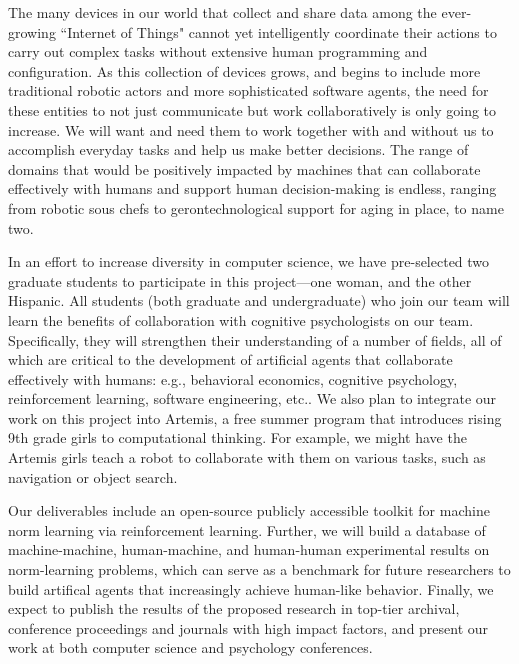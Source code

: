 The many devices in our world that collect and share data among
the ever-growing ``Internet of Things"
cannot yet intelligently coordinate their actions to carry out complex
tasks without extensive human programming and configuration.  As this
collection of devices grows, and begins to include more traditional
robotic actors and more sophisticated software agents, the need for
these entities to not just communicate but work collaboratively is
only going to increase.  We will want and need them to work together
with and without us to accomplish everyday tasks and help us make
better decisions.
%
The range of domains that would be positively impacted by machines
that can collaborate effectively with humans and support human
decision-making is endless, ranging from robotic sous chefs to
gerontechnological support for aging in place, to name two.


In an effort to increase diversity in computer science, we have
pre-selected two graduate students to participate in this
project---one woman, and the other Hispanic.  All students (both
graduate and undergraduate) who join our team will learn the benefits
of collaboration with cognitive psychologists on our team.  Specifically, they will
strengthen their understanding of a number of fields, all of which are
critical to the development of artificial agents that collaborate
effectively with humans: e.g., behavioral economics, cognitive
psychology, reinforcement learning, software engineering, etc..
%
We also plan to integrate our work on this project into Artemis, a
free summer program that introduces rising 9th grade girls to
computational thinking.
For example, we might have the Artemis girls teach a robot to
collaborate with them on various tasks, such as navigation or object search.

Our deliverables include an open-source publicly accessible toolkit for machine norm learning via reinforcement learning. Further, we will build a database of machine-machine, human-machine, and human-human experimental results on norm-learning problems, which can serve as a benchmark for future researchers to build artifical agents that increasingly achieve human-like behavior. 
%
Finally, we expect to publish the results of the proposed research in
top-tier archival, conference proceedings and journals with high
impact factors, and present our work at both computer science and
psychology conferences.



